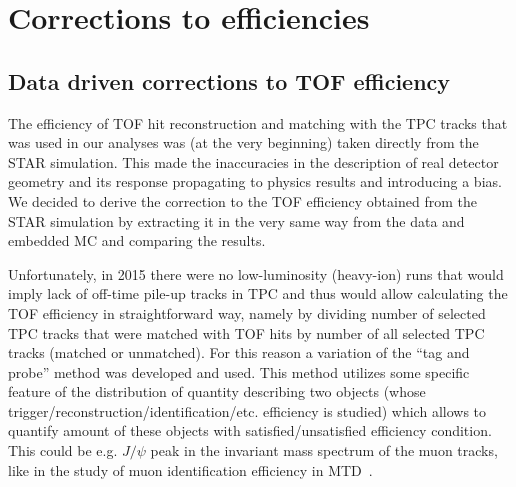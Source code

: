 

\chapter{Corrections to efficiencies}\label{chap:tpcTofEffCorr}

\section{Data driven corrections to TOF efficiency}\label{sec:tofAbsEffCorr}

The efficiency of TOF hit reconstruction and matching with the TPC tracks that was used in our analyses was (at the very beginning) taken directly from the STAR simulation. This made the inaccuracies in the description of real detector geometry and its response propagating to physics results and introducing a bias. We decided to derive the correction to the TOF efficiency obtained from the STAR simulation by extracting it in the very same way from the data and embedded MC and comparing the results.%

Unfortunately, in 2015 there were no low-luminosity (heavy-ion) runs that would imply lack of off-time pile-up tracks in TPC and thus would allow calculating the TOF efficiency in straightforward way, namely by dividing number of selected TPC tracks that were matched with TOF hits by number of all selected TPC tracks (matched or unmatched). For this reason a variation of the ``tag and probe'' method was developed and used. This method utilizes some specific feature of the distribution of quantity describing two objects (whose trigger/reconstruction/identification/etc. efficiency is studied) which allows to quantify amount of these objects with satisfied/unsatisfied efficiency condition. This could be e.g. $J/\psi$ peak in the invariant mass spectrum of the muon tracks, like in the study of muon identification efficiency in MTD~\cite{Huang:2016dbm}. %

